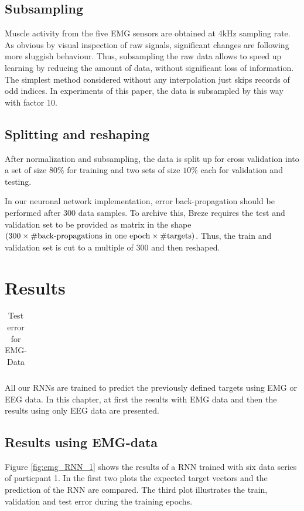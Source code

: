 \documentclass{article} %
\begin{document}
\subsection{Subsampling}
Muscle activity from the five EMG sensors are obtained at 4kHz sampling rate. As obvious by visual inspection of raw signals, significant changes are following more sluggish behaviour. Thus, subsampling the raw data allows to speed up learning by reducing the amount of data, without significant loss of information. The simplest method considered without any interpolation just skips records of odd indices. In experiments of this paper, the data is subsampled by this way with factor 10.

\subsection{Splitting and reshaping}
After normalization and subsampling, the data is split up for cross validation into a set of size $80\%$ for training and two sets of size $10\%$ each for validation and testing.

In our neuronal network implementation, error back-propagation should be performed after 300 data samples. To archive this, Breze requires the test and validation set to be provided as matrix in the shape $(300 \times \# \textnormal{back-propagations in one epoch} \times \# \textnormal{targets)}$. Thus, the train and validation set is cut to a multiple of 300 and then reshaped.

\section{Results}
\begin{table}[htpb]
        \centering
        \caption{Test error for EMG-Data}
        \label{tab:label}
        \begin{tabular}{c}
        
        \end{tabular}
\end{table}
All our RNNs are trained to predict the previously defined targets using EMG or EEG data. In this chapter, at first the results with EMG data and then the results using only EEG data are presented.
\subsection{Results using EMG-data}
Figure \ref{fig:emg_RNN_1} shows the results of a RNN trained with six data series of particpant 1. In the first two plots the expected target vectors and the prediction of the RNN are compared. The third plot illustrates the train, validation and test error during the training epochs.
\end{document}
